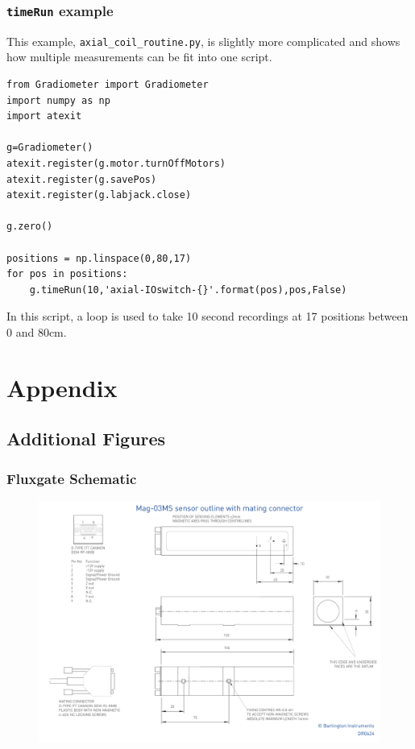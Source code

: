 \documentclass{TheMartianReport}
\newcommand{\pyinline}[1]{\texttt{#1}}
\newcommand{\shellinline}[1]{\texttt{#1}}
\begin{document}
\subsubsection{\pyinline{timeRun} example}
This example, \shellinline{axial_coil_routine.py}, is slightly more complicated and shows how multiple measurements can be fit into one script.
\begin{verbatim}
from Gradiometer import Gradiometer
import numpy as np
import atexit

g=Gradiometer()
atexit.register(g.motor.turnOffMotors)
atexit.register(g.savePos)
atexit.register(g.labjack.close)

g.zero()

positions = np.linspace(0,80,17)
for pos in positions:
    g.timeRun(10,'axial-IOswitch-{}'.format(pos),pos,False)
\end{verbatim}
In this script, a loop is used to take 10 second recordings at 17 positions between 0 and 80cm. 

\section{Appendix}
\subsection{Additional Figures}
\subsubsection{Fluxgate Schematic}
\begin{figure}[h]
	\centering
	\includegraphics[angle=-90,origin=c,scale=0.6]{Mag-03_Drawing}
	\caption{}
	\label{fig:FGschematic}
\end{figure}
\end{document}
